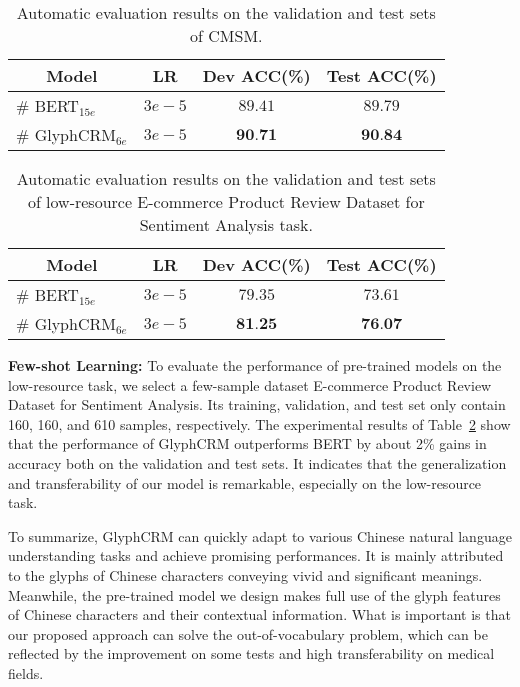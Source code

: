 \begin{table}[t]
\renewcommand\arraystretch{1.1}
    \centering
     \caption{Automatic evaluation results on the validation and test sets of CMSM.}
    \label{tab:exp8}
    \begin{tabular}{lccc}
    \toprule[0.9pt]
    \multicolumn{1}{c}{\textbf{Model}} & \multicolumn{1}{c}{\textbf{LR}} & \multicolumn{1}{c}{\textbf{Dev ACC(\%)}} & \multicolumn{1}{c}{\textbf{Test ACC(\%)}} \\\midrule[0.7pt]
    \# BERT$_{15e}$ & $3e-5$ & $89.41$ & $89.79$ \\
    \# GlyphCRM$_{6e}$ & $3e-5$ & $\textbf{90.71}$ & $\textbf{90.84}$\\
    \bottomrule[0.9pt]
    \end{tabular}
\end{table}

\begin{table}[t]
\renewcommand\arraystretch{1.1}
    \centering
     \caption{Automatic evaluation results on the validation and test sets of low-resource E-commerce Product Review Dataset for Sentiment Analysis task.}
    \label{tab:exp9}
    \begin{tabular}{lccc}
    \toprule[0.9pt]
    \multicolumn{1}{c}{\textbf{Model}} & \multicolumn{1}{c}{\textbf{LR}} & \multicolumn{1}{c}{\textbf{Dev ACC(\%)}} & \multicolumn{1}{c}{\textbf{Test ACC(\%)}} \\\midrule[0.7pt]
    \# BERT$_{15e}$ & $3e-5$ & $79.35$ & $73.61$ \\
    \# GlyphCRM$_{6e}$ & $3e-5$ & $\textbf{81.25}$ & $\textbf{76.07}$\\
    \bottomrule[0.9pt]
    \end{tabular}
\end{table}

\noindent\textbf{Few-shot Learning:} To evaluate the performance of pre-trained models on the low-resource task, we select a few-sample dataset E-commerce Product Review Dataset for Sentiment Analysis\cite{FewCLUE}. Its training, validation, and test set only contain 160, 160, and 610 samples, respectively. The experimental results of Table~\ref{tab:exp9} show that the performance of GlyphCRM outperforms BERT by about 2\% gains in accuracy both on the validation and test sets. It indicates that the generalization and transferability of our model is remarkable, especially on the low-resource task. 

To summarize, GlyphCRM can quickly adapt to various Chinese natural language understanding tasks and achieve promising performances. It is mainly attributed to the glyphs of Chinese characters conveying vivid and significant meanings. Meanwhile, the pre-trained model we design makes full use of the glyph features of Chinese characters and their contextual information. What is important is that our proposed approach can solve the out-of-vocabulary problem, which can be reflected by the improvement on some tests and high transferability on medical fields.











